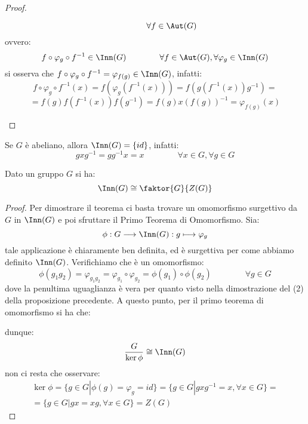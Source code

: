 \documentclass[11pt]{scrartcl}
\begin{document}
\begin{proof}
\begin{enumerate}[(1)]
\[                    \qquad \qquad \forall f \in \Aut(G)
                        \]
                ovvero:
                    \[ f \circ \varphi_g \circ f^{-1} \in \Inn(G)
                    \qquad \qquad \forall f \in \Aut(G), \forall \varphi_g \in \Inn(G)
                        \]
                si osserva che $f \circ \varphi_g \circ f^{-1} = \varphi_{f(g)} \in \Inn(G)$, infatti:
                    \[ f \circ \varphi_g \circ f^{-1} (x) = f(\varphi_g(f^{-1} (x))) = f(g(f^{-1}(x))g^{-1}) =
                        \]\[ = f(g) f(f^{-1}(x)) f(g^{-1}) = f(g) x (f(g))^{-1} = \varphi_{f(g)}(x)
                            \]
        \end{enumerate}
\end{proof}

\begin{remark}
    Se $G$ è abeliano, allora $\Inn(G) = \{id\}$, infatti:
        \[ gxg^{-1} = gg^{-1}x = x \qquad \qquad \forall x \in G, \forall g \in G
            \]
\end{remark}

\begin{proposition}
    Dato un gruppo $G$ si ha:
    \[\Inn(G) \cong \faktor{G}{Z(G)}\]
\end{proposition}

\begin{proof}
    Per dimostrare il teorema ci basta trovare un omomorfismo surgettivo da $G$ in $\Inn(G)$ e poi sfruttare il Primo Teorema di Omomorfismo. Sia:
        \[ \phi : G \longrightarrow \Inn(G) : g \longmapsto \varphi_g
            \]
    tale applicazione è chiaramente ben definita, ed è surgettiva per come abbiamo definito $\Inn(G)$. Verifichiamo che è un omomorfismo:
        \[ \phi(g_1g_2) = \varphi_{g_1g_2} = \varphi_{g_1} \circ \varphi_{g_2} = \phi(g_1) \circ \phi(g_2)
        \qquad \qquad \forall g \in G
            \]
        dove la penultima uguaglianza è vera per quanto visto nella dimostrazione del (2) della proposizione precedente. A questo punto, per il 
        primo teorema di omomorfismo si ha che:
            \begin{center}
            \end{center}
        dunque:
            \[ \frac{G}{\ker{\phi}} \cong \Inn(G)
                \]
        non ci resta che osservare:
            \begin{multline*}
                \ker{\phi} = \{g \in G | \phi(g) = \varphi_g = id\} = \{g \in G | gxg^{-1} = x, \forall x \in G\} = \\ 
                = \{g \in G | gx = xg, \forall x \in G\} = Z(G)
            \end{multline*}
\end{proof}
\end{document}
